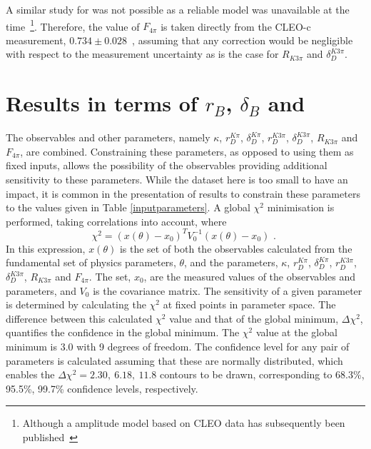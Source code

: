 A similar study for \decay{\Dz}{\pim\pip\pim\pip} was not possible as a reliable model was unavailable at the time~\footnote{Although a \decay{\Dz}{\pim\pip\pim\pip} amplitude model based on CLEO data has subsequently been published~\cite{4piamplitude}}. Therefore, the value of $F_{4\pi}$ is taken directly from the CLEO-c measurement, $0.734 \pm 0.028$~\cite{charm4pi}, assuming that any correction would be negligible with respect to the measurement uncertainty as is the case for $R_{K3\pi}$ and $\delta_D^{K3\pi}$. 

\section{Results in terms of $r_B$, $\delta_B$ and \Pgamma}
\label{sec:interpretation:gammadini}

The \CP observables and other parameters, namely $\kappa$, $r_D^{K\pi}$, $\delta_D^{K\pi}$, $r_D^{K3\pi}$, $\delta_D^{K3\pi}$, $R_{K3\pi}$ and $F_{4\pi}$, are combined. Constraining these parameters, as opposed to using them as fixed inputs, allows the possibility of the \CP observables providing additional sensitivity to these parameters. While the dataset here is too small to have an impact, it is common in the presentation of \lhcb results to constrain these parameters to the values given in Table \ref{inputparameters}. A global $\chi^2$ minimisation is performed, taking correlations into account, where
\begin{equation}
\chi^2 = (x(\theta) - x_0)^TV_0^{-1}(x(\theta)-x_0) \text{ . }
\end{equation}
In this expression, $x(\theta)$ is the set of both the observables calculated from the fundamental set of physics parameters, $\theta$, and the parameters, $\kappa$, $r_D^{K\pi}$, $\delta_D^{K\pi}$, $r_D^{K3\pi}$, $\delta_D^{K3\pi}$, $R_{K3\pi}$ and $F_{4\pi}$. The set, $x_0$, are the measured values of the observables and parameters, and $V_0$ is the covariance matrix. The sensitivity of a given parameter is determined by calculating the $\chi^2$ at fixed points in parameter space. The difference between this calculated $\chi^2$ value and that of the global minimum, $\Delta\chi^2$, quantifies the confidence in the global minimum. The $\chi^2$ value at the global minimum is 3.0 with 9 degrees of freedom. The confidence level for any pair of parameters is calculated assuming that these are normally distributed, which enables the $\Delta \chi^2 = 2.30,\ 6.18,\ 11.8$ contours to be drawn, corresponding to 68.3\%, 95.5\%, 99.7\% confidence levels, respectively. 


